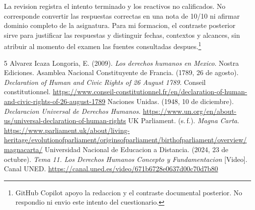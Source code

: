 \documentclass[spanish,letterpaper,oneside]{article}
\begin{document}
La revision registra el intento terminado y los reactivos no calificados.
No corresponde convertir las respuestas correctas en una nota de
10/10 ni afirmar dominio completo de la asignatura. Para mi formacion,
el contraste posterior sirve para justificar las respuestas y distinguir
fechas, contextos y alcances, sin atribuir al momento del examen las
fuentes consultadas despues.\footnote{GitHub Copilot apoyo la redaccion
y el contraste documental posterior. No respondio ni envio este intento
del cuestionario.}

\clearpage
\begin{thebibliography}{5}
Alvarez Icaza Longoria, E. (2009). \emph{Los derechos humanos en Mexico}.
Nostra Ediciones.
Asamblea Nacional Constituyente de Francia. (1789, 26 de agosto).
\emph{Declaration of Human and Civic Rights of 26 August 1789}.
Conseil constitutionnel.
\url{https://www.conseil-constitutionnel.fr/en/declaration-of-human-and-civic-rights-of-26-august-1789}
Naciones Unidas. (1948, 10 de diciembre).
\emph{Declaracion Universal de Derechos Humanos}.
\url{https://www.un.org/en/about-us/universal-declaration-of-human-rights}
UK Parliament. (s.\,f.). \emph{Magna Carta}.
\url{https://www.parliament.uk/about/living-heritage/evolutionofparliament/originsofparliament/birthofparliament/overview/magnacarta/}
Universidad Nacional de Educacion a Distancia. (2024, 23 de octubre).
\emph{Tema 11. Los Derechos Humanos Concepto y Fundamentacion} [Video].
Canal UNED. \url{https://canal.uned.es/video/671b6728e0637d00c70d7b80}
\end{thebibliography}
\end{document}
